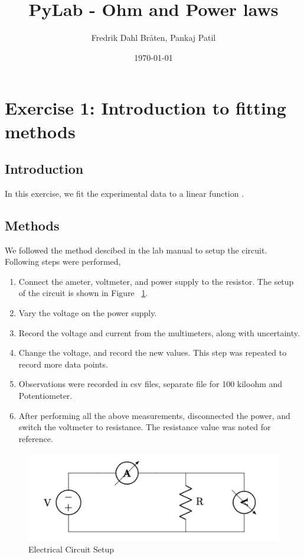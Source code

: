 \documentclass[letterpaper,12pt]{article}
\begin{document}
\title{PyLab - Ohm and Power laws}
\author{Fredrik Dahl Bråten, Pankaj Patil}
\date{\today}
\maketitle

\section{Exercise 1:  Introduction to fitting methods}

\subsection{Introduction}

In this exercise, we fit the experimental data to a linear function \cite{lab-manual-ex1}.  

\subsection{Methods}

We followed the method descibed in the lab manual to setup the circuit. Following steps were 
performed,

\begin{enumerate}
  \item Connect the ameter, voltmeter, and power supply to the resistor. The setup of the circuit is shown in Figure ~\ref{setup}.
  \item Vary the voltage on the power supply.
  \item Record the voltage and current from the multimeters, along with uncertainty.
  \item Change the voltage, and record the new values. This step was repeated to record more data  points.
  \item Observations were recorded in csv files, separate file for 100 kiloohm and Potentiometer.
  \item After performing all the above measurements, disconnected the power, and switch the voltmeter to resistance. The resistance value was noted for reference.
\end{enumerate}

\begin{figure}[H]
  \centering
  \includegraphics[width=0.8\linewidth]{../lab_1_ex_1_setup.png}    
  \caption{Electrical Circuit Setup}
  \label{setup}
\end{figure}
\end{document}
